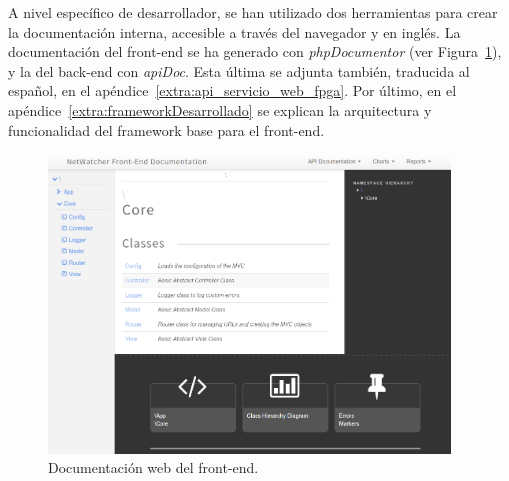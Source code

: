 A nivel específico de desarrollador, se han utilizado dos herramientas para crear la documentación interna, accesible a través del navegador y en inglés. 
La documentación del \gls{front-end} se ha generado con \textit{phpDocumentor} (ver Figura~\ref{fig:captura:docsfrontend}), y la del \gls{back-end} con \textit{apiDoc}.
Esta última se adjunta también, traducida al español, en el apéndice~\ref{extra:api_servicio_web_fpga}.
Por último, en el apéndice~\ref{extra:frameworkDesarrollado} se explican la arquitectura y funcionalidad del \gls{framework} base para el \gls{front-end}.

\begin{figure}[!htp]
  \centering
  \includegraphics[width=0.95\textwidth,clip=true]{graphics/capturas/docs_frontend}
  \caption{Documentación web del \gls{front-end}.}
  \label{fig:captura:docsfrontend}
\end{figure} 
